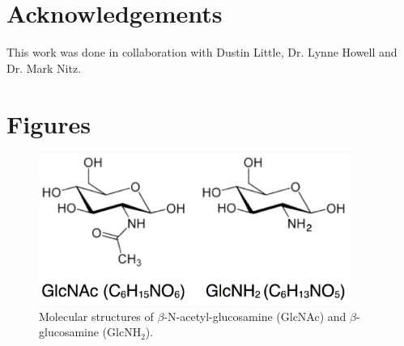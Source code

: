 
\section{Acknowledgements}
This work was done in collaboration with Dustin Little, Dr. Lynne Howell and Dr. Mark Nitz.

\section{Figures}

\begin{figure}[htbp]
\centering
\includegraphics[width=4in]{figures/results4/sugar_structures.pdf}
\caption[Molecular structures of GlcNAc and GlcNH$_2$]{Molecular structures of $\beta$-N-acetyl-glucosamine (GlcNAc) and $\beta$-glucosamine (GlcNH$_2$).}
\label{fig:nag}
\end{figure}

